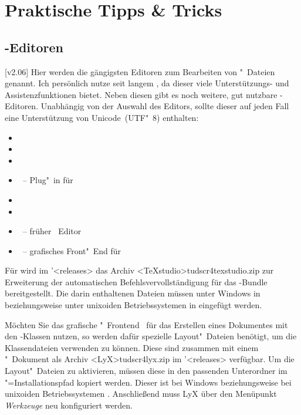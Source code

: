 \chapter{%
  Praktische Tipps \& Tricks%
  \label{sec:tips}%
}
\section{%
  -Editoren%
  \label{sec:tips:editor}%
}
[v2.06]%
Hier werden die gängigsten Editoren zum Bearbeiten von "~Dateien 
genannt. Ich persönlich nutze seit langem , da 
dieser viele Unterstützungs- und Assistenzfunktionen bietet. Neben diesen gibt 
es noch weitere, gut nutzbare -Editoren. Unabhängig von der 
Auswahl des Editors, sollte dieser auf jeden Fall eine Unterstützung von 
Unicode~(UTF"~8) enthalten:
%
\begin{itemize}
\item {}
\item {}
\item {}
\item {}~-- Plug"~in für 
\item {}
\item {}
\item {}~-- früher ~Editor
\item {}~-- grafisches Front"~End für 
\end{itemize}
%
Für  wird im \GitHubRepo'<releases> das Archiv 
\GitHubDownload<TeXstudio>{tudscr4texstudio.zip} zur Erweiterung der 
automatischen Befehlsvervollständigung für das \TUDScript-Bundle 
bereitgestellt. Die darin enthaltenen Dateien müssen unter Windows in 
 beziehungsweise unter unixoiden 
Betriebssystemen in  eingefügt werden.

Möchten Sie das grafische "~Frontend~ 
für das Erstellen eines Dokumentes mit den \TUDScript-Klassen nutzen, so werden 
dafür spezielle Layout"~Dateien benötigt, um die Klassendateien verwenden zu 
können. Diese sind zusammen mit einem "~Dokument als 
Archiv \GitHubDownload<LyX>{tudscr4lyx.zip} im \GitHubRepo'<releases> 
verfügbar. Um die Layout"~Dateien zu aktivieren, müssen diese in den passenden 
Unterordner im "=Installationspfad kopiert werden. 
Dieser ist bei Windows
beziehungsweise bei unixoiden Betriebssystemen .
Anschließend muss LyX über den Menüpunkt \emph{Werkzeuge} neu konfiguriert 
werden. 



